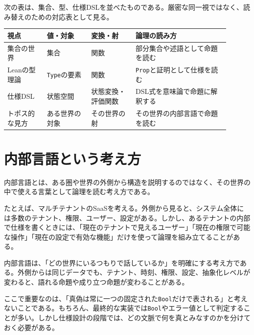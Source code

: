次の表は、集合、型、仕様DSLを並べたものである。厳密な同一視ではなく、読み替えのための対応表として見る。

\begin{center}
\begin{tabular}{@{}p{0.16\linewidth}p{0.18\linewidth}p{0.18\linewidth}p{0.38\linewidth}@{}}
\toprule
視点 & 値・対象 & 変換・射 & 論理の読み方 \\
\midrule
集合の世界 & 集合 & 関数 & 部分集合や述語として命題を読む \\
Leanの型理論 & \texttt{Type}の要素 & 関数 & \texttt{Prop}と証明として仕様を読む \\
仕様DSL & 状態空間 & 状態変換・評価関数 & DSL式を意味論で命題に解釈する \\
トポス的な見方 & ある世界の対象 & その世界の射 & その世界の内部言語で命題を読む \\
\bottomrule
\end{tabular}
\end{center}

\section{内部言語という考え方}

内部言語とは、ある圏や世界の外側から構造を説明するのではなく、その世界の中で使える言葉として論理を読む考え方である。

たとえば、マルチテナントのSaaSを考える。外側から見ると、システム全体には多数のテナント、権限、ユーザー、設定がある。しかし、あるテナントの内部で仕様を書くときには、「現在のテナントで見えるユーザー」「現在の権限で可能な操作」「現在の設定で有効な機能」だけを使って論理を組み立てることがある。

\begin{intuitionbox}
内部言語は、「どの世界にいるつもりで話しているか」を明確にする考え方である。外側からは同じデータでも、テナント、時刻、権限、設定、抽象化レベルが変わると、語れる命題や成り立つ命題が変わることがある。
\end{intuitionbox}


ここで重要なのは、「真偽は常に一つの固定された\texttt{Bool}だけで表される」と考えないことである。もちろん、最終的な実装では\texttt{Bool}やエラー値として判定することが多い。しかし仕様設計の段階では、どの文脈で何を真とみなすのかを分けておく必要がある。

